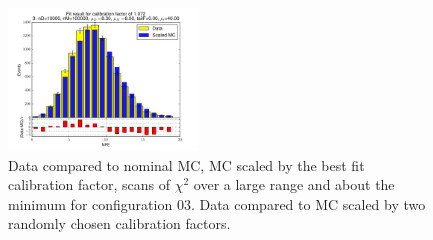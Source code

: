 \begin{figure}[htbp]
\begin{center}
\includegraphics[width=0.45\textwidth]{../FIGURES/03/FIG_Fit_result_for_calibration_factor_of_1_072.pdf} 
\caption{Data compared to nominal MC, MC scaled by the best fit calibration factor, scans of $\chi^2$ over a large range and about the minimum for configuration 03. Data compared to MC scaled by two randomly chosen calibration factors.} 
\label{tab:best_03} 
\end{center} \end{figure} 

